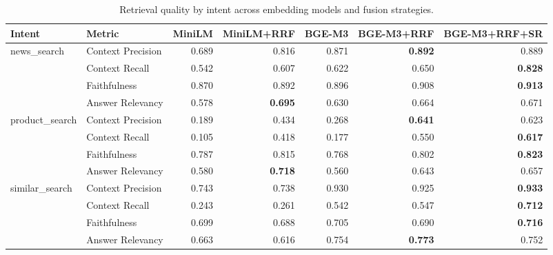 \begin{table}[htbp]
\centering
\caption{Retrieval quality by intent across embedding models and fusion strategies.}
\label{tab:compare-intent}
\small
\begin{tabular}{llrrrrr}
\toprule
Intent & Metric & MiniLM & MiniLM+RRF & BGE-M3 & BGE-M3+RRF & BGE-M3+RRF+SR \\
\midrule
news_search & Context Precision & 0.689 & 0.816 & 0.871 & \textbf{0.892} & 0.889 \\
 & Context Recall & 0.542 & 0.607 & 0.622 & 0.650 & \textbf{0.828} \\
 & Faithfulness & 0.870 & 0.892 & 0.896 & 0.908 & \textbf{0.913} \\
 & Answer Relevancy & 0.578 & \textbf{0.695} & 0.630 & 0.664 & 0.671 \\
product_search & Context Precision & 0.189 & 0.434 & 0.268 & \textbf{0.641} & 0.623 \\
 & Context Recall & 0.105 & 0.418 & 0.177 & 0.550 & \textbf{0.617} \\
 & Faithfulness & 0.787 & 0.815 & 0.768 & 0.802 & \textbf{0.823} \\
 & Answer Relevancy & 0.580 & \textbf{0.718} & 0.560 & 0.643 & 0.657 \\
similar_search & Context Precision & 0.743 & 0.738 & 0.930 & 0.925 & \textbf{0.933} \\
 & Context Recall & 0.243 & 0.261 & 0.542 & 0.547 & \textbf{0.712} \\
 & Faithfulness & 0.699 & 0.688 & 0.705 & 0.690 & \textbf{0.716} \\
 & Answer Relevancy & 0.663 & 0.616 & 0.754 & \textbf{0.773} & 0.752 \\
\bottomrule
\end{tabular}
\end{table}